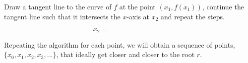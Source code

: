 
 Draw a tangent line to the curve of $f$ at the point $(x_1, f(x_1))$, continue the tangent line such that it intersects the $x$-axis at $x_2$ and repeat the steps.

\vspace{3cm}
\[
	x_{2} = \qquad \qquad \qquad \qquad
\]
\vspace{1cm}

 Repeating the algorithm for each point, we will obtain a sequence of points, $\{x_0, x_1, x_2, x_3, ...\}$, that ideally get closer and closer to the root $r$.


